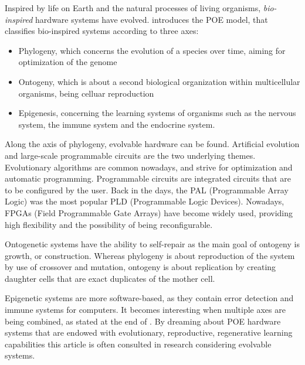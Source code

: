 
Inspired by life on Earth and the natural processes of living organisms, \emph{bio-inspired} hardware systems have evolved. \cite{poe} introduces the POE model, that classifies bio-inspired systems according to three axes:
\begin{itemize}
	\item Phylogeny, which concerns the evolution of a species over time, aiming for optimization of the genome
	\item Ontogeny, which is about a second biological organization within multicellular organisms, being celluar reproduction
	\item Epigenesis, concerning the learning systems of organisms such as the nervous system, the immune system and the endocrine system.
\end{itemize}

Along the axis of phylogeny, evolvable hardware can be found. Artificial evolution and large-scale programmable circuits are the two underlying themes. Evolutionary algorithms are common nowadays, and strive for optimization and automatic programming. Programmable circuits are integrated circuits that are to be configured by the user. Back in the days, the PAL (Programmable Array Logic) was the most popular PLD (Programmable Logic Devices). Nowadays, FPGAs (Field Programmable Gate Arrays) have become widely used, providing high flexibility and the possibility of being reconfigurable.

Ontogenetic systems have the ability to self-repair as the main goal of ontogeny is growth, or construction. Whereas phylogeny is about reproduction of the system by use of crossover and mutation, ontogeny is about replication by creating daughter cells that are exact duplicates of the mother cell.

Epigenetic systems are more software-based, as they contain error detection and immune systems for computers. It becomes interesting when multiple axes are being combined, as stated at the end of \cite{poe}. By dreaming about POE hardware systems that are endowed with evolutionary, reproductive, regenerative learning capabilities this article is often consulted in research considering evolvable systems.